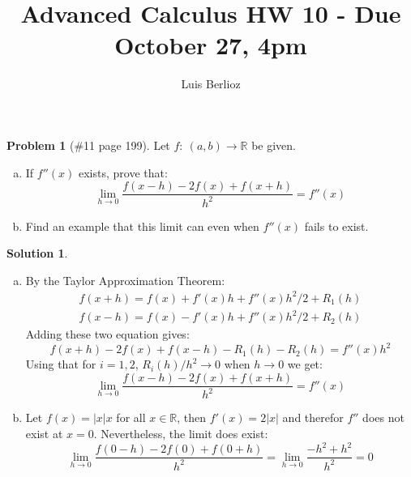 \documentclass{article}
\theoremstyle{definition}
\newtheorem*{soln}{Solution}
\newtheorem*{prob}{Problem}
\theoremstyle{theorem}
\newcommand{\R}{\mathbb{R}}
\begin{document}
\title{Advanced Calculus HW 10 - Due October 27, 4pm}
\author{Luis Berlioz}
\maketitle



\begin{prob}[\#11 page 199]
    Let $f:\ (a,b) \to \R$ be given.
    \begin{enumerate}[(a)]
        \item If $f''(x)$ exists, prove that:
            $$\lim_{h\to 0} \frac{f(x-h) - 2 f(x) + f(x+h)}{h^2} = f''(x)$$
        \item Find an example that this limit can even when $f''(x)$ fails to exist.
    \end{enumerate}
\end{prob}
\begin{soln}
    \begin{enumerate}[(a)]
        \item By the Taylor Approximation Theorem:
            \begin{gather*}
                f(x+h) = f(x) +f'(x)h+f''(x)h^2/2 + R_1(h)\\
                f(x-h) = f(x) -f'(x)h+f''(x)h^2/2 + R_2(h)
            \end{gather*}
            Adding these two equation gives: 
            $$f(x+h) - 2f(x) +f(x-h) -R_1(h) - R_2(h) = f''(x)h^2$$
            Using that for $i=1,2$, $R_i(h)/h^2 \to 0$ when $h\to 0$ we get:
            $$\lim_{h\to 0} \frac{f(x-h) - 2 f(x) + f(x+h)}{h^2} = f''(x)$$
        \item Let $f(x) = |x|x$ for all $x\in \R$, then $f'(x) =2|x|$  and therefor $f''$ does not exist at $x=0$. Nevertheless, the limit does exist:
            $$\lim_{h\to 0} \frac{f(0-h) - 2 f(0) + f(0+h)}{h^2} = \lim_{h\to 0 } \frac{-h^2+h^2}{h^2} = 0$$
    \end{enumerate}
\end{soln}
\vspace{1in}
\end{document}
